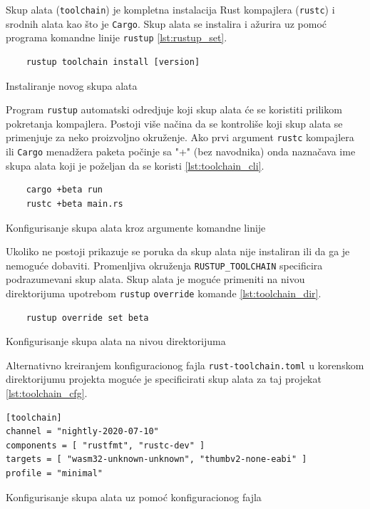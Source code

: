 \documentclass[11pt]{article}
\begin{document}
Skup alata (\verb|toolchain|) je kompletna instalacija Rust kompajlera (\verb|rustc|) i srodnih alata kao što 
je \verb|Cargo|. Skup alata se instalira i ažurira uz pomoć programa komandne linije \verb|rustup| \ref{lst:rustup_set}. 

\begin{listing}[H]
\begin{verbatim}
    rustup toolchain install [version]
\end{verbatim}
\caption{Instaliranje novog skupa alata}
\label{lst:rustup_set}
\end{listing}

Program \verb|rustup| automatski odredjuje koji skup alata će se koristiti prilikom pokretanja kompajlera. 
Postoji više načina da se kontroliše koji skup alata se primenjuje za neko proizvoljno okruženje.
Ako prvi argument \verb|rustc| kompajlera ili \verb|Cargo| menadžera paketa počinje sa "+" (bez navodnika) 
onda naznačava ime skupa alata koji je poželjan da se koristi \ref{lst:toolchain_cli}. 

\begin{listing}[H]
\begin{verbatim}
    cargo +beta run 
    rustc +beta main.rs
\end{verbatim}
\caption{Konfigurisanje skupa alata kroz argumente komandne linije}
\label{lst:toolchain_cli}
\end{listing}

Ukoliko ne postoji prikazuje se poruka da skup 
alata nije instaliran ili da ga je nemoguće dobaviti. Promenljiva okruženja \verb|RUSTUP_TOOLCHAIN| specificira 
podrazumevani skup alata. Skup alata je moguće primeniti na nivou direktorijuma upotrebom \verb|rustup| \verb|override|
komande \ref{lst:toolchain_dir}. 

\begin{listing}[H]
\begin{verbatim}
    rustup override set beta 
\end{verbatim}
\caption{Konfigurisanje skupa alata na nivou direktorijuma}
\label{lst:toolchain_dir}
\end{listing}

Alternativno kreiranjem konfiguracionog fajla \verb|rust-toolchain.toml| u korenskom 
direktorijumu projekta moguće je specificirati skup alata za taj projekat \ref{lst:toolchain_cfg}.

\begin{listing}[H]
\begin{verbatim}
[toolchain]
channel = "nightly-2020-07-10"
components = [ "rustfmt", "rustc-dev" ]
targets = [ "wasm32-unknown-unknown", "thumbv2-none-eabi" ]
profile = "minimal"
\end{verbatim}
\caption{Konfigurisanje skupa alata uz pomoć konfiguracionog fajla}
\label{lst:toolchain_cfg}
\end{listing}
\end{document}

